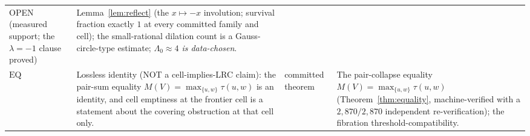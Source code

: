 {\begin{longtable}{@{}p{}p{}
                   p{}p{}@{}}
OPEN (measured support; the $\lambda=-1$ clause proved) &
Lemma~\ref{lem:reflect} (the $x\mapsto-x$ involution; survival fraction
exactly $1$ at every committed family and cell); the small-rational
dilation count is a Gauss-circle-type estimate;
\emph{$\Lambda_0\approx 4$ is data-chosen}. \\
$\mathrm{EQ}$ &
Lossless identity (NOT a cell-implies-LRC claim): the pair-sum equality
$M(V)=\max_{\{u,w\}}\tau(u,w)$ is an identity, and cell emptiness at the
frontier cell is a statement about the covering obstruction at that cell
only. &
committed theorem &
The pair-collapse equality
$M(V)=\max_{\{u,w\}}\tau(u,w)$ (Theorem~\ref{thm:equality},
machine-verified with a $2{,}870/2{,}870$ independent re-verification);
the fibration threshold-compatibility. \\
\end{longtable}
}


